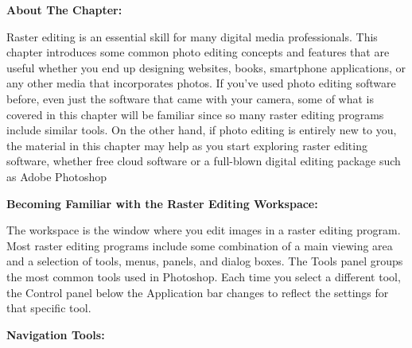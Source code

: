 \documentclass{report}
\begin{document}
   \pagebreak \bigbreak \noindent 
   \begin{Large}
       \textbf{About The Chapter:}
   \end{Large}
   \bigbreak \noindent
   Raster editing is an essential skill for many digital media professionals. This chapter introduces some common photo editing concepts and features that are useful whether you end up designing websites, books, smartphone applications, or any other media that incorporates photos. If you’ve used photo editing software before, even just the software that came with your camera, some of what is covered in this chapter will be familiar since so many raster editing programs include similar tools. On the other hand, if photo editing is entirely new to you, the material in this chapter may help as you start exploring raster editing software, whether free cloud software or a full-blown digital editing package such as Adobe Photoshop
    \bigbreak \noindent \bigbreak \bigbreak
    \begin{Large}
        \noindent \textbf{Becoming Familiar with the Raster Editing Workspace:}
    \end{Large}
    \bigbreak \noindent
    The workspace is the window where you edit images in a raster editing program. Most raster editing programs include some combination of a main viewing area and a selection of tools, menus, panels, and dialog boxes.
    \bigbreak \noindent
    The Tools panel groups the most common tools used in Photoshop. Each time you select a different tool, the Control panel below the Application bar changes to reflect the settings for that specific tool.

    \bigbreak \noindent \bigbreak \noindent
    \begin{Large}
        \textbf{Navigation Tools:}
    \end{Large}
    \bigbreak \noindent
    
\end{document}
